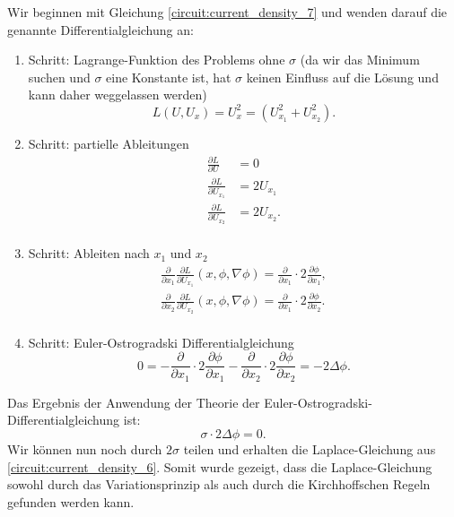 Wir beginnen mit Gleichung \eqref{circuit:current_density_7} und wenden darauf die genannte Differentialgleichung an:
\begin{enumerate}
	\item Schritt: Lagrange-Funktion des Problems ohne $\sigma$ (da wir das Minimum suchen und $\sigma$ eine Konstante ist, hat $\sigma$ keinen Einfluss auf die Lösung und kann daher weggelassen werden)
	\begin{equation}
		L(U, U_x)= U_x^2 = (U_{x_1}^2+U_{x_2}^2).
	\end{equation}
	\item Schritt: partielle Ableitungen
	\begin{equation}
		\begin{aligned}
			\frac{\partial L}{\partial U}&=0\\
			\frac{\partial L}{\partial U_{x_1}}&=2U_{x_1}\\
			\frac{\partial L}{\partial U_{x_2}}&=2U_{x_2}.\\
		\end{aligned}
	\end{equation}
	\item Schritt: Ableiten nach $x_1$ und $x_2$
	\begin{equation}
		\begin{aligned}
			\frac{\partial}{\partial x_1}\frac{\partial L}{\partial U_{x_1}}(x,\phi,\nabla \phi)= \frac{\partial}{\partial x_1}\cdot 2\frac{\partial \phi}{\partial {x_1}},\\
			\frac{\partial}{\partial x_2}\frac{\partial L}{\partial U_{x_2}}(x,\phi,\nabla \phi)= \frac{\partial}{\partial x_1}\cdot 2\frac{\partial \phi}{\partial {x_2}} .\\
		\end{aligned}
	\end{equation}
	\item Schritt: Euler-Ostrogradski Differentialgleichung
	\begin{equation}
		0=-\frac{\partial}{\partial x_1}\cdot 2\frac{\partial \phi}{\partial {x_1}}-\frac{\partial}{\partial x_2}\cdot 2\frac{\partial \phi}{\partial {x_2}}=-2\Delta\phi.
	\end{equation}
\end{enumerate}

Das Ergebnis der Anwendung der Theorie der Euler-Ostrogradski-Differentialgleichung ist:
	\begin{equation}
	\sigma \cdot 2\Delta\phi=0.
	\end{equation}
Wir können nun noch durch $2\sigma$ teilen und erhalten die Laplace-Gleichung aus \eqref{circuit:current_density_6}. Somit wurde gezeigt, dass die Laplace-Gleichung sowohl durch das Variationsprinzip als auch durch die Kirchhoffschen Regeln gefunden werden kann.



